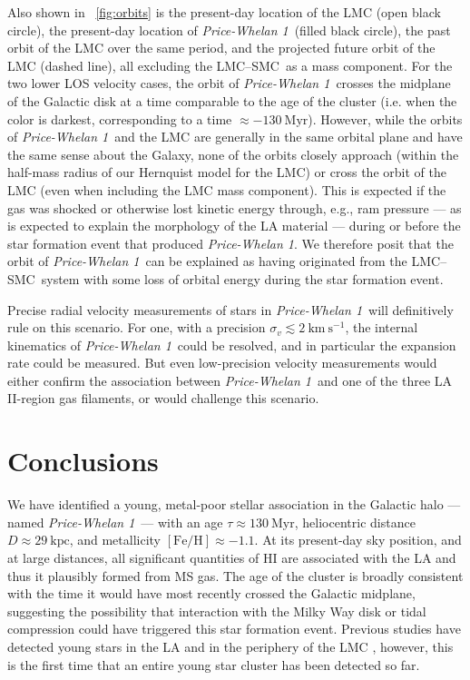 \documentclass[twocolumn]{aastex62}
\newcommand{\kms}{\ensuremath{\textrm{km}~\textrm{s}^{-1}}}
\newcommand{\feh}{\ensuremath{[\textrm{Fe} / \textrm{H}]}}
\newcommand{\hi}{H{\footnotesize I} }
\newcommand{\clustername}{\textsl{Price-Whelan 1}}
\newcommand{\lmcsmc}{LMC--SMC}
\newcommand{\clage}{\ensuremath{130~\textrm{Myr}}}
\newcommand{\clfeh}{\ensuremath{-1.1}}
\newcommand{\cldist}{\ensuremath{29~\textrm{kpc}}}
\begin{document}
Also shown in \figurename~\ref{fig:orbits} is the present-day location of the LMC (open black circle), the present-day location of \clustername\ (filled black circle), the past orbit of the LMC over the same period, and the projected future orbit of the LMC (dashed line), all excluding the \lmcsmc\ as a mass component.
For the two lower LOS velocity cases, the orbit of \clustername\ crosses the midplane of the Galactic disk at a time comparable to the age of the cluster (i.e. when the color is darkest, corresponding to a time $\approx -130~\textrm{Myr}$).
However, while the orbits of \clustername\ and the LMC are generally in the same orbital plane and have the same sense about the Galaxy, none of the orbits closely approach (within the half-mass radius of our Hernquist model for the LMC) or cross the orbit of the LMC (even when including the LMC mass component).
This is expected if the gas was shocked or otherwise lost kinetic energy through, e.g., ram pressure --- as is expected to explain the morphology of the LA material \citep[e.g.,][]{Hammer:2015} --- during or before the star formation event that produced \clustername.
We therefore posit that the orbit of \clustername\ can be explained as having originated from the \lmcsmc\ system with some loss of orbital energy during the star formation event.

Precise radial velocity measurements of stars in \clustername\ will definitively rule on this scenario.
For one, with a precision $\sigma_v \lesssim 2~\kms$, the internal kinematics of \clustername\ could be resolved, and in particular the expansion rate could be measured.
But even low-precision velocity measurements would either confirm the association between \clustername\ and one of the three LA II-region gas filaments, or would challenge this scenario.


\section{Conclusions} \label{sec:conclusion}

We have identified a young, metal-poor stellar association in the Galactic halo --- named \clustername\ --- with an age $\tau \approx \clage$, heliocentric distance $D \approx \cldist$, and metallicity $\feh \approx \clfeh$.
At its present-day sky position, and at large distances, all significant quantities of \hi are associated with the LA and thus it plausibly formed from MS gas.
The age of the cluster is broadly consistent with the time it would have most recently crossed the Galactic midplane, suggesting the possibility that interaction with the Milky Way disk or tidal compression could have triggered this star formation event.
Previous studies have detected young stars in the LA and in the periphery of the LMC \citep{Casetti-Dinescu:2014, Moni-Bidin:2017}, however, this is the first time that an entire young star cluster has been detected so far.%
\end{document}
